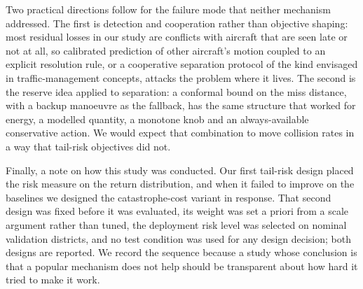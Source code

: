 Two practical directions follow for the failure mode that neither mechanism addressed. The first is detection and cooperation rather than objective shaping: most residual losses in our study are conflicts with aircraft that are seen late or not at all, so calibrated prediction of other aircraft's motion coupled to an explicit resolution rule, or a cooperative separation protocol of the kind envisaged in traffic-management concepts, attacks the problem where it lives. The second is the reserve idea applied to separation: a conformal bound on the miss distance, with a backup manoeuvre as the fallback, has the same structure that worked for energy, a modelled quantity, a monotone knob and an always-available conservative action. We would expect that combination to move collision rates in a way that tail-risk objectives did not.

Finally, a note on how this study was conducted. Our first tail-risk design placed the risk measure on the return distribution, and when it failed to improve on the baselines we designed the catastrophe-cost variant in response. That second design was fixed before it was evaluated, its weight was set a priori from a scale argument rather than tuned, the deployment risk level was selected on nominal validation districts, and no test condition was used for any design decision; both designs are reported. We record the sequence because a study whose conclusion is that a popular mechanism does not help should be transparent about how hard it tried to make it work.
